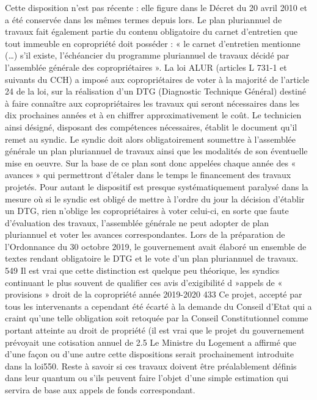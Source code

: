 Cette disposition n’est pas récente : elle figure dans le Décret du 20 avril 2010 et a été conservée dans les mêmes termes depuis lors.
Le plan pluriannuel de travaux fait également partie du contenu obligatoire du carnet d’entretien que tout immeuble en copropriété doit posséder : « le carnet d’entretien mentionne (…) s’il existe, l’échéancier du programme pluriannuel de travaux décidé par l’assemblée générale des copropriétaires ».
La loi ALUR (articles L 731-1 et suivants du CCH) a imposé aux copropriétaires de voter à la majorité de l’article 24 de la loi, sur la réalisation d’un DTG (Diagnostic Technique Général) destiné à faire connaître aux copropriétaires les travaux qui seront nécessaires dans les dix prochaines années et à en chiffrer approximativement le coût.
Le technicien ainsi désigné, disposant des compétences nécessaires, établit le document qu’il remet au syndic. Le syndic doit alors obligatoirement soumettre à l’assemblée générale un plan pluriannuel de travaux ainsi que les modalités de son éventuelle mise en oeuvre.
Sur la base de ce plan sont donc appelées chaque année des « avances » qui permettront d’étaler dans le temps le financement des travaux projetés.
Pour autant le dispositif est presque systématiquement paralysé dans la mesure où si le syndic est obligé de mettre à l’ordre du jour la décision d’établir un DTG, rien n’oblige les copropriétaires à voter celui-ci, en sorte que faute d’évaluation des travaux, l’assemblée générale ne peut adopter de plan pluriannuel et voter les avances correspondantes.
Lors de la préparation de l’Ordonnance du 30 octobre 2019, le gouvernement avait élaboré un ensemble de textes rendant obligatoire le DTG et le vote d’un plan pluriannuel de travaux.
549 Il est vrai que cette distinction est quelque peu théorique, les syndics continuant le plus souvent de qualifier ces avis d’exigibilité d »appels de « provisions »
droit de la copropriété année 2019-2020
433
Ce projet, accepté par tous les intervenants a cependant été écarté à la demande du Conseil d'Etat qui a craint qu’une telle obligation soit retoquée par la Conseil Constitutionnel comme portant atteinte au droit de propriété (il est vrai que le projet du gouvernement prévoyait une cotisation annuel de 2.5 %
Le Ministre du Logement a affirmé que d’une façon ou d’une autre cette dispositions serait prochainement introduite dans la loi550.
Reste à savoir si ces travaux doivent être préalablement définis dans leur quantum ou s’ils peuvent faire l’objet d’une simple estimation qui servira de base aux appels de fonds correspondant.
